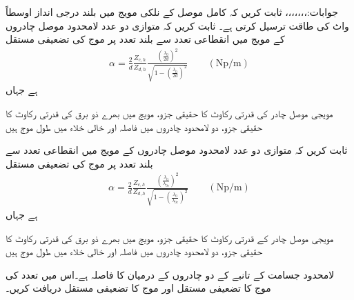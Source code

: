 جوابات:،،،،،،،
ثابت کریں کہ کامل موصل کے نلکی مویج میں  بلند درجی انداز اوسطاً  واٹ کی طاقت ترسیل کرتی ہے۔
ثابت کریں کہ متوازی دو عدد لامحدود موصل چادروں کے مویج میں انقطاعی تعدد سے بلند تعدد پر  موج کی تضعیفی مستقل
\begin{align*}
 \alpha=\frac{2}{d}\frac{Z_{c,h}}{Z_{d,h}}\frac{\left(\frac{\lambda_0}{2d}\right)^2}{\sqrt{1-\left(\frac{\lambda_0}{2d}\right)^2}} \quad \quad (\si{\neper/ \meter})
\end{align*}
 ہے جہاں
\begin{description}
 مویجی موصل چادر کی قدرتی رکاوٹ کا حقیقی جزو،
 مویج میں بھرے ذو برق کی قدرتی رکاوٹ کا حقیقی جزو،
 دو لامحدود چادروں میں فاصلہ اور
 خالی خلاء میں طول موج ہیں
\end{description}
ثابت کریں کہ متوازی دو عدد لامحدود موصل چادروں کے مویج میں انقطاعی تعدد سے بلند تعدد پر  موج کی تضعیفی مستقل
\begin{align*}
 \alpha=\frac{2}{d}\frac{Z_{c,h}}{Z_{d,h}}\frac{\left(\frac{\lambda_0}{\lambda_{0c}}\right)^2}{\sqrt{1-\left(\frac{\lambda_0}{\lambda_{0c}}\right)^2}} \quad \quad (\si{\neper/ \meter})
\end{align*}
 ہے جہاں
\begin{description}
 مویجی موصل چادر کے قدرتی رکاوٹ کا حقیقی جزو،
 مویج میں بھرے ذو برق کی قدرتی رکاوٹ کا حقیقی جزو،
 دو لامحدود چادروں میں فاصلہ اور
 خالی خلاء میں طول موج ہیں
\end{description}
لامحدود جسامت کے تانبے کے دو چادروں کے درمیان  کا فاصلہ ہے۔اس میں  تعدد کی  موج کا تضعیفی مستقل اور  موج  کا تضعیفی مستقل دریافت کریں۔ 


